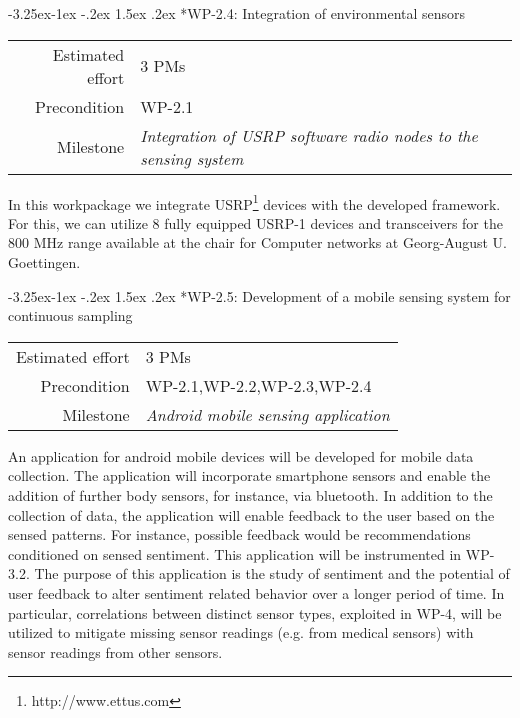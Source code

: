 \documentclass[12pt]{article}
\makeatletter
\newcommand{\kobyc}[1]{\begin{center}\fbox{\parbox{3in}{{\textcolor{green}{K: #1}}}}\end{center}}
\renewcommand\paragraph{\@startsection{paragraph}{4}{\z@}%
  {-3.25ex\@plus -1ex \@minus -.2ex}%
  {1.5ex \@plus .2ex}%
  {\normalfont\normalsize\bfseries}}
\makeatother
\begin{document}

\paragraph*{WP-2.4: Integration of environmental sensors}
\begin{tabular}{rl}
 Estimated effort& 3 PMs\\
 Precondition & WP-2.1\\
 Milestone & \begin{minipage}[t]{12.2cm}
\textit{Integration of USRP software radio nodes to the  sensing system}\vspace{.2cm}
             \end{minipage}
\end{tabular}

\noindent
In this workpackage we integrate USRP\footnote{http://www.ettus.com} devices with the developed framework. 
For this, we can utilize 8 fully equipped USRP-1 devices and transceivers for the 800 MHz range available at the chair for Computer networks at Georg-August U. Goettingen.


\paragraph*{WP-2.5: Development of a mobile sensing system for continuous sampling}
\begin{tabular}{rl}
 Estimated effort& 3 PMs\\
 Precondition & WP-2.1,WP-2.2,WP-2.3,WP-2.4\\
 Milestone & \begin{minipage}[t]{12.2cm}
\textit{Android mobile sensing application}\vspace{.2cm}
             \end{minipage}
\end{tabular}

\noindent
An application for android mobile devices will be developed for mobile data collection. 
The application will incorporate smartphone sensors and enable the addition of further body sensors, for instance, via bluetooth.
In addition to the collection of data, the application will enable feedback to the user based on the sensed patterns. 
For instance, possible feedback would be recommendations conditioned on sensed sentiment.  
This application will be instrumented in WP-3.2.
The purpose of this application is the study of sentiment and the potential of user feedback to alter sentiment related behavior over a longer period of time. 
In particular, correlations between distinct sensor types, exploited in WP-4, will be utilized to mitigate missing sensor readings (e.g. from medical sensors) with sensor readings from other sensors.  
\end{document}
